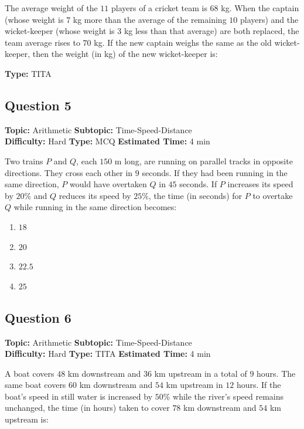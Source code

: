 \documentclass[11pt]{article}
\begin{document}
\begin{tcolorbox}
The average weight of the \(11\) players of a cricket team is \(68\) kg. When the captain (whose weight is \(7\) kg more than the average of the remaining \(10\) players) and the wicket-keeper (whose weight is \(3\) kg less than that average) are both replaced, the team average rises to \(70\) kg. If the new captain weighs the same as the old wicket-keeper, then the weight (in kg) of the new wicket-keeper is:
\end{tcolorbox}

\textbf{Type:} TITA

\subsection*{Question 5}
\textbf{Topic:} Arithmetic \quad \textbf{Subtopic:} Time-Speed-Distance \\
\textbf{Difficulty:} Hard \quad \textbf{Type:} MCQ \quad \textbf{Estimated Time:} 4 min

\begin{tcolorbox}
Two trains \(P\) and \(Q\), each \(150\) m long, are running on parallel tracks in opposite directions. They cross each other in \(9\) seconds. If they had been running in the same direction, \(P\) would have overtaken \(Q\) in \(45\) seconds. If \(P\) increases its speed by \(20\%\) and \(Q\) reduces its speed by \(25\%\), the time (in seconds) for \(P\) to overtake \(Q\) while running in the same direction becomes:
\end{tcolorbox}

\begin{enumerate}[label=(\Alph*)]
    \item \(18\)
    \item \(20\)
    \item \(22.5\)
    \item \(25\)
\end{enumerate}

\subsection*{Question 6}
\textbf{Topic:} Arithmetic \quad \textbf{Subtopic:} Time-Speed-Distance \\
\textbf{Difficulty:} Hard \quad \textbf{Type:} TITA \quad \textbf{Estimated Time:} 4 min

\begin{tcolorbox}
A boat covers \(48\) km downstream and \(36\) km upstream in a total of \(9\) hours. The same boat covers \(60\) km downstream and \(54\) km upstream in \(12\) hours. If the boat's speed in still water is increased by \(50\%\) while the river's speed remains unchanged, the time (in hours) taken to cover \(78\) km downstream and \(54\) km upstream is:
\end{tcolorbox}
\end{document}
